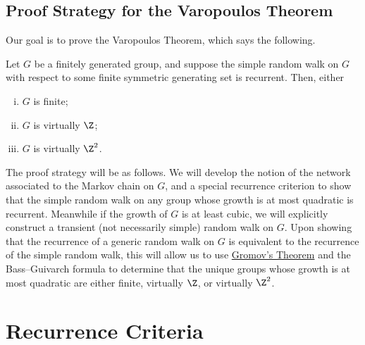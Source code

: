 \documentclass[10pt]{mypackage}
\begin{document}
\subsection{Proof Strategy for the Varopoulos Theorem}%
Our goal is to prove the Varopoulos Theorem, which says the following.
\begin{theorem}[Varopoulos]
  Let $G$ be a finitely generated group, and suppose the simple random walk on $G$ with respect to some finite symmetric generating set is recurrent. Then, either
  \begin{enumerate}[(i)]
    \item $G$ is finite;
    \item $G$ is virtually $\Z$;
    \item $G$ is virtually $\Z^2$.
  \end{enumerate}
\end{theorem}
The proof strategy will be as follows. We will develop the notion of the network associated to the Markov chain on $G$, and a special recurrence criterion to show that the simple random walk on any group whose growth is at most quadratic is recurrent. Meanwhile if the growth of $G$ is at least cubic, we will explicitly construct a transient (not necessarily simple) random walk on $G$. Upon showing that the recurrence of a generic random walk on $G$ is equivalent to the recurrence of the simple random walk, this will allow us to use \href{https://ai-bearing.github.io/Classes_and_Homework/After\%20College/Other\%20Notes/Groups\%20and\%20Dynamics/gromovs_theorem.pdf}{Gromov's Theorem} and the Bass--Guivarch formula to determine that the unique groups whose growth is at most quadratic are either finite, virtually $\Z$, or virtually $\Z^2$.
\section{Recurrence Criteria}%
\end{document}

